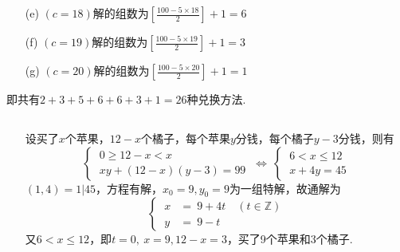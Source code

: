 \documentclass[UTF8]{ctexart}
\begin{document}
\begin{enumerate}
\begin{enumerate}
\begin{comment}
                    a&=7 ;\\
                    b&=4 ;\\
                    c&=17 ;
                \end{cases}
                \quad
                \begin{cases}
                    a&=9 ;\\
                    b&=3 ;\\
                    c&=17 ;
                \end{cases}
                \quad
                \begin{cases}
                    a&=11 ;\\
                    b&=2 ;\\
                    c&=17 ;
                \end{cases}
            \]\end{comment}
            \item [(e)]$(c=18)$解的组数为$\left[\displaystyle{\frac{100-5\times 18}{2}}\right]+1=6$
            \item [(f)]$(c=19)$解的组数为$\left[\displaystyle{\frac{100-5\times 19}{2}}\right]+1=3$
            \item [(g)]$(c=20)$解的组数为$\left[\displaystyle{\frac{100-5\times 20}{2}}\right]+1=1$
        \end{enumerate}
        即共有$2+3+5+6+6+3+1=26$种兑换方法.
    \end{enumerate}

\subsection{}   %
\begin{enumerate}
    \item []设买了$x$个苹果，$12-x$个橘子，每个苹果$y$分钱，每个橘子$y-3$分钱，则有
    \[
        \begin{cases}
            \ 0 \geq 12-x  < x \\
            \ xy + (12-x)(y-3)  = 99
        \end{cases}
        \ \Leftrightarrow\
        \begin{cases}
            \ 6 < x \leq 12 \\
            \ x + 4y = 45
        \end{cases} 
    \]
    $(1,4)=1|45$，方程有解，$x_0=9,y_0=9$为一组特解，故通解为
    \[
        \begin{cases}
            \ x & =\  9 + 4t \quad (t\in \mathbb{Z})\\
            \ y & =\  9 - t
        \end{cases}
    \]
    又$6 < x \leq 12 $，即$t=0,\ x=9,12-x=3$，买了9个苹果和3个橘子.
\end{enumerate}
\end{document}
